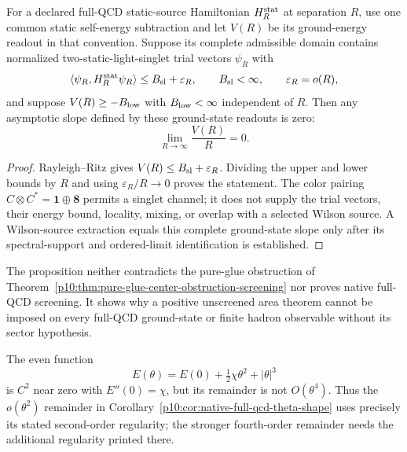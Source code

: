 \documentclass[12pt,a4paper]{article}
\begin{document}
\begin{proposition}
\label{p10:prop:v2187-conditional-static-light-screening}
For a declared full-QCD static-source Hamiltonian $H_R^{\rm stat}$ at separation
$R$, use one common static self-energy subtraction and let $V(R)$ be its
ground-energy readout in that convention.  Suppose its complete admissible
domain contains normalized two-static-light-singlet trial vectors $\psi_R$
with
\[
 \langle\psi_R,H_R^{\rm stat}\psi_R\rangle
 \le B_{\rm sl}+\varepsilon_R,
 \qquad B_{\rm sl}<\infty,\qquad \varepsilon_R=o(R),
\]
and suppose $V(R)\ge-B_{\rm low}$ with $B_{\rm low}<\infty$ independent of $R$.
Then any asymptotic slope defined by these ground-state readouts is zero:
\[
 \lim_{R\to\infty}\frac{V(R)}{R}=0.
\]
\end{proposition}
\begin{proof}
Rayleigh--Ritz gives $V(R)\le B_{\rm sl}+\varepsilon_R$.  Dividing the upper and
lower bounds by $R$ and using $\varepsilon_R/R\to0$ proves the statement.
The color pairing $C\otimes C^*=\mathbf1\oplus\mathbf8$ permits a singlet
channel; it does not supply the trial vectors, their energy bound, locality,
mixing, or overlap with a selected Wilson source.  A Wilson-source extraction
equals this complete ground-state slope only after its spectral-support and
ordered-limit identification is established.
\end{proof}

The proposition neither contradicts the pure-glue obstruction of
Theorem~\ref{p10:thm:pure-glue-center-obstruction-screening} nor proves native
full-QCD screening.  It shows why a positive unscreened area theorem cannot
be imposed on every full-QCD ground-state or finite hadron observable without
its sector hypothesis.

\begin{remark}
\label{p10:rem:v2187-c2-source-remainder-comparison}
The even function
\[
 E(\theta)=E(0)+\tfrac12\chi\theta^2+|\theta|^3
\]
is $C^2$ near zero with $E''(0)=\chi$, but its remainder is not
$O(\theta^4)$.  Thus the $o(\theta^2)$ remainder in
Corollary~\ref{p10:cor:native-full-qcd-theta-shape} uses precisely its stated
second-order regularity; the stronger fourth-order remainder needs the
additional regularity printed there.
\end{remark}

\end{document}
